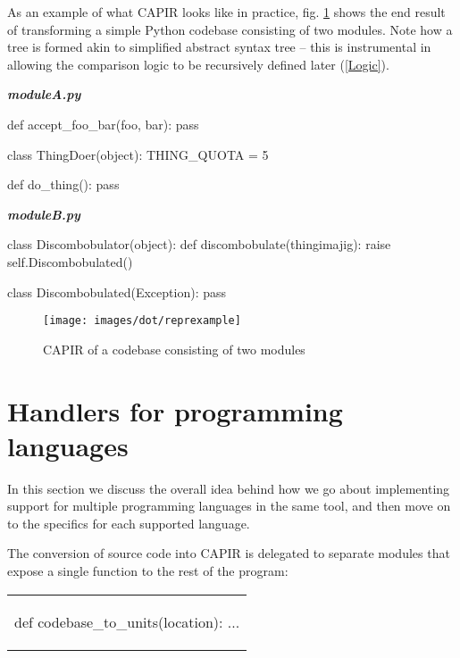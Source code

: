 \documentclass{l4proj}
\newenvironment{halfmini}[1]
{
\begin{minipage}[t]{0.5\textwidth}
\noindent\textbf{\textit{#1}}\\
}
{
\end{minipage}
}
\begin{document}
\clearpage
As an example of what CAPIR looks like in practice, fig.
\ref{RepresentationExample} shows the end result of transforming a
simple Python codebase consisting of two modules. Note how a tree is
formed akin to simplified abstract syntax tree -- this is instrumental
in allowing the comparison logic to be recursively defined later
(\ref{Logic}).

\begin{halfmini}{moduleA.py}
\begin{python}
def accept_foo_bar(foo, bar):
    pass

class ThingDoer(object):
    THING_QUOTA = 5

    def do_thing():
        pass
\end{python}
\end{halfmini}
\begin{halfmini}{moduleB.py}
\begin{python}
class Discombobulator(object):
    def discombobulate(thingimajig):
        raise self.Discombobulated()

    class Discombobulated(Exception):
        pass
\end{python}
\end{halfmini}

\begin{figure}[H]
\centering
\texttt{[image: images/dot/reprexample]}
\caption{CAPIR of a codebase consisting of two modules}
\label{RepresentationExample}
\end{figure}
\clearpage

\section{Handlers for programming languages}
\label{LanguageHandlers}

In this section we discuss the overall idea behind how we go about
implementing support for multiple programming languages in the same
tool, and then move on to the specifics for each supported language.

The conversion of source code into CAPIR is delegated to separate
modules that expose a single function to the rest of the program:

\begin{center}
\begin{tabular}{c}
\begin{python}
def codebase_to_units(location):
    ...
\end{python}
\end{tabular}
\end{center}
\end{document}
